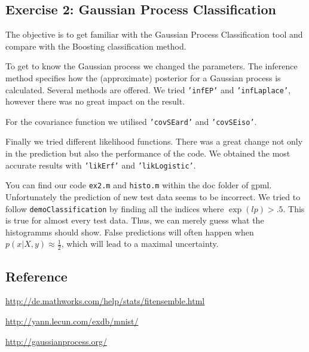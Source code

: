\documentclass[12pt,a4paper,twoside]{article}
\begin{document}
\subsection*{Exercise 2: Gaussian Process Classification}
The objective is to get familiar with the Gaussian Process Classification tool and compare with the Boosting classification method. 

To get to know the Gaussian process we changed the parameters. The inference method specifies how the (approximate) posterior for a Gaussian process is calculated. Several methods are offered. We tried \texttt{'infEP'} and \texttt{'infLaplace'}, however there was no great impact on the result. 

For the covariance function we utilised \texttt{'covSEard'} and \texttt{'covSEiso'}.

Finally we tried different likelihood functions. There was a great change not only in the prediction but also the performance of the code. We obtained the most accurate results with \texttt{'likErf'} and \texttt{'likLogistic'}.

You can find our code \texttt{ex2.m} and \texttt{histo.m} within the doc folder of gpml.
Unfortunately the prediction of new test data seems to be incorrect. We tried to follow \texttt{demoClassification} by finding all the indices where $\exp(lp)>.5$. This is true for almost every test data. Thus, we can merely guess what the histogramms should show. False predictions will often happen when $p(x|X,y) \approx \frac 12$, which will lead to a maximal uncertainty.

\subsection*{Reference}

\url{http://de.mathworks.com/help/stats/fitensemble.html}

\url{http://yann.lecun.com/exdb/mnist/}

\url{http://gaussianprocess.org/}
\end{document}
